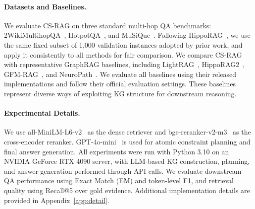\documentclass{article}
\theoremstyle{plain}
\theoremstyle{definition}
\theoremstyle{remark}
\begin{document}
\paragraph{Datasets and Baselines.}
We evaluate CS-RAG on three standard multi-hop QA benchmarks: 2WikiMultihopQA~\cite{2wiki}, HotpotQA~\cite{hotpotqa}, and MuSiQue~\cite{Musique}.
Following HippoRAG~\cite{hipporag}, we use the same fixed subset of 1{,}000 validation instances adopted by prior work, and apply it consistently to all methods for fair comparison.
We compare CS-RAG with representative GraphRAG baselines, including LightRAG~\cite{lightrag}, HippoRAG2~\cite{hipporag2}, GFM-RAG~\cite{gfm-rag}, and NeuroPath~\cite{neuropath}. We evaluate all baselines using their released implementations and follow their official evaluation settings.
These baselines represent diverse ways of exploiting KG structure for downstream reasoning. 


\paragraph{Experimental Details.}
We use all-MiniLM-L6-v2~\cite{sentence-bert} as the dense retriever and bge-reranker-v2-m3~\cite{bge-reranker-v2-m3} as the cross-encoder reranker. GPT-4o-mini~\cite{gpt-4o} is used for atomic constraint planning and final answer generation. All experiments were run with Python 3.10 on an NVIDIA GeForce RTX 4090 server, with LLM-based KG construction, planning, and answer generation performed through API calls.
We evaluate downstream QA performance using Exact Match (EM) and token-level F1, and retrieval quality using Recall@5 over gold evidence. Additional implementation details are provided in Appendix~\ref{app:detail}.



\providecommand{\metric}[1]{\textsc{#1}}
\newcommand{\avgstd}[2]{#1\,/\,#2}
\newcommand{\bestavg}[1]{\textcolor{AvgColor}{\textbf{#1}}}
\newcommand{\secondavg}[1]{\textcolor{AvgColor}{\underline{#1}}}
\newcommand{\beststd}[1]{\textcolor{StdColor}{\textbf{#1}}}
\newcommand{\secondstd}[1]{\textcolor{StdColor}{\underline{#1}}}
\end{document}
